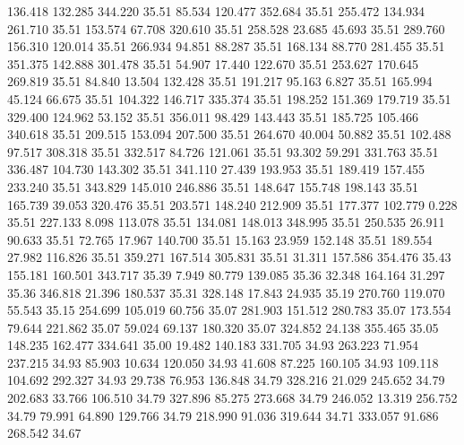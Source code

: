  136.418  132.285  344.220        35.51
  85.534  120.477  352.684        35.51
 255.472  134.934  261.710        35.51
 153.574   67.708  320.610        35.51
 258.528   23.685   45.693        35.51
 289.760  156.310  120.014        35.51
 266.934   94.851   88.287        35.51
 168.134   88.770  281.455        35.51
 351.375  142.888  301.478        35.51
  54.907   17.440  122.670        35.51
 253.627  170.645  269.819        35.51
  84.840   13.504  132.428        35.51
 191.217   95.163    6.827        35.51
 165.994   45.124   66.675        35.51
 104.322  146.717  335.374        35.51
 198.252  151.369  179.719        35.51
 329.400  124.962   53.152        35.51
 356.011   98.429  143.443        35.51
 185.725  105.466  340.618        35.51
 209.515  153.094  207.500        35.51
 264.670   40.004   50.882        35.51
 102.488   97.517  308.318        35.51
 332.517   84.726  121.061        35.51
  93.302   59.291  331.763        35.51
 336.487  104.730  143.302        35.51
 341.110   27.439  193.953        35.51
 189.419  157.455  233.240        35.51
 343.829  145.010  246.886        35.51
 148.647  155.748  198.143        35.51
 165.739   39.053  320.476        35.51
 203.571  148.240  212.909        35.51
 177.377  102.779    0.228        35.51
 227.133    8.098  113.078        35.51
 134.081  148.013  348.995        35.51
 250.535   26.911   90.633        35.51
  72.765   17.967  140.700        35.51
  15.163   23.959  152.148        35.51
 189.554   27.982  116.826        35.51
 359.271  167.514  305.831        35.51
  31.311  157.586  354.476        35.43
 155.181  160.501  343.717        35.39
   7.949   80.779  139.085        35.36
  32.348  164.164   31.297        35.36
 346.818   21.396  180.537        35.31
 328.148   17.843   24.935        35.19
 270.760  119.070   55.543        35.15
 254.699  105.019   60.756        35.07
 281.903  151.512  280.783        35.07
 173.554   79.644  221.862        35.07
  59.024   69.137  180.320        35.07
 324.852   24.138  355.465        35.05
 148.235  162.477  334.641        35.00
  19.482  140.183  331.705        34.93
 263.223   71.954  237.215        34.93
  85.903   10.634  120.050        34.93
  41.608   87.225  160.105        34.93
 109.118  104.692  292.327        34.93
  29.738   76.953  136.848        34.79
 328.216   21.029  245.652        34.79
 202.683   33.766  106.510        34.79
 327.896   85.275  273.668        34.79
 246.052   13.319  256.752        34.79
  79.991   64.890  129.766        34.79
 218.990   91.036  319.644        34.71
 333.057   91.686  268.542        34.67
